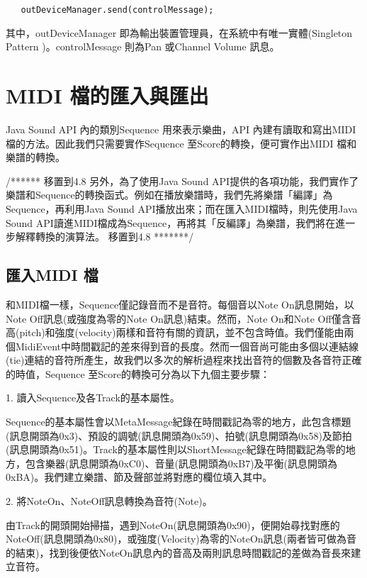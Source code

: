 \documentclass[12pt,a4paper,oneside]{report}
\begin{document}
\begin{verbatim}
   outDeviceManager.send(controlMessage);
\end{verbatim}

其中，outDeviceManager 即為輸出裝置管理員，在系統中有唯一實體(Singleton Pattern \cite{designPatterns})。controlMessage 則為Pan 或Channel Volume 訊息。


\section{MIDI 檔的匯入與匯出}

Java Sound API 內的類別Sequence 用來表示樂曲，API 內建有讀取和寫出MIDI檔的方法。因此我們只需要實作Sequence 至Score的轉換，便可實作出MIDI 檔和樂譜的轉換。

/******  移置到4.8  
另外，為了使用Java Sound API提供的各項功能，我們實作了樂譜和Sequence的轉換函式。例如在播放樂譜時，我們先將樂譜「編譯」為Sequence，再利用Java Sound API播放出來；而在匯入MIDI檔時，則先使用Java Sound API讀進MIDI檔成為Sequence，再將其「反編譯」為樂譜，我們將在進一步解釋轉換的演算法。
移置到4.8  *******/

\subsection{匯入MIDI 檔}

和MIDI檔一樣，Sequence僅記錄音而不是音符。每個音以Note On訊息開始，以Note Off訊息(或強度為零的Note On訊息)結束。然而，Note On和Note Off僅含音高(pitch)和強度(velocity)兩樣和音符有關的資訊，並不包含時值。我們僅能由兩個MidiEvent中時間戳記的差來得到音的長度。然而一個音尚可能由多個以連結線(tie)連結的音符所產生，故我們以多次的解析過程來找出音符的個數及各音符正確的時值，Sequence 至Score的轉換可分為以下九個主要步驟： 

1. 讀入Sequence及各Track的基本屬性。 

Sequence的基本屬性會以MetaMessage紀錄在時間戳記為零的地方，此包含標題(訊息開頭為0x3)、預設的調號(訊息開頭為0x59)、拍號(訊息開頭為0x58)及節拍(訊息開頭為0x51)。Track的基本屬性則以ShortMessage紀錄在時間戳記為零的地方，包含樂器(訊息開頭為0xC0)、音量(訊息開頭為0xB7)及平衡(訊息開頭為0xBA)。我們建立樂譜、節及聲部並將對應的欄位填入其中。

2. 將NoteOn、NoteOff訊息轉換為音符(Note)。 

由Track的開頭開始掃描，遇到NoteOn(訊息開頭為0x90)，便開始尋找對應的NoteOff(訊息開頭為0x80)，或強度(Velocity)為零的NoteOn訊息(兩者皆可做為音的結束)，找到後便依NoteOn訊息內的音高及兩則訊息時間戳記的差做為音長來建立音符。
\end{document}
